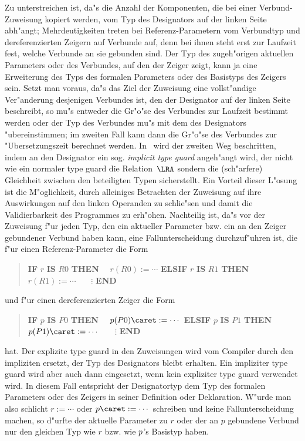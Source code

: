 Zu unterstreichen ist, da"s die Anzahl der Komponenten, die bei einer
Verbund-Zuweisung kopiert werden, vom Typ des Designators auf der linken Seite
abh"angt; Mehrdeutigkeiten treten bei Referenz-Parametern
vom Verbundtyp und dereferenzierten Zeigern auf Verbunde auf, denn bei ihnen
steht erst zur Laufzeit fest, welche Verbunde an sie gebunden sind.
Der Typ des zugeh"origen aktuellen Parameters oder des Verbundes, auf den der
Zeiger zeigt, kann ja eine Erweiterung des Typs des formalen Parameters oder
des Basistyps des Zeigers sein.
Setzt man voraus, da"s das Ziel der Zuweisung eine vollst"andige Ver"anderung
desjenigen Verbundes ist, den der Designator auf der linken Seite beschreibt,
so mu"s entweder die Gr"o"se des Verbundes zur Laufzeit bestimmt werden oder
der Typ des Verbundes mu"s mit dem des Designators "ubereinstimmen;
im zweiten Fall kann dann die Gr"o"se des Verbundes zur "Ubersetzungszeit
berechnet werden.
In \oberon\ wird der zweiten Weg beschritten, indem an den Designator ein
sog. {\it implicit type guard\/} angeh"angt wird, der nicht wie ein normaler
type guard die Relation~$\LRA$ sondern die (sch"arfere) Gleichheit zwischen
den beteiligten Typen sicherstellt.
Ein Vorteil dieser L"osung ist die M"oglichkeit, durch alleiniges Betrachten
der Zuweisung auf ihre Auswirkungen auf den linken Operanden
zu schlie"sen und damit die Validierbarkeit des Programmes zu erh"ohen.
Nachteilig ist, da"s vor der Zuweisung f"ur jeden Typ, den ein aktueller Parameter
bzw. ein an den Zeiger gebundener Verbund haben kann, eine Fallunterscheidung
durchzuf"uhren ist, die f"ur einen Referenz-Parameter die Form
\begin{quotation}
\obeylines
{\bf IF} $r$ {\bf IS} $R0$ {\bf THEN}
\ \ $r(R0):=\cdots$
{\bf ELSIF} $r$ {\bf IS} $R1$ {\bf THEN}
\ \ $r(R1):=\cdots$
\ \ \ $\vdots$
{\bf END}
\end{quotation}
und f"ur einen dereferenzierten Zeiger die Form
\begin{quotation}
\obeylines
{\bf IF} $p$ {\bf IS} $P0$ {\bf THEN}
\ \ $p(P0)\caret:=\cdots$
{\bf ELSIF} $p$ {\bf IS} $P1$ {\bf THEN}
\ \ $p(P1)\caret:=\cdots$
\ \ \ $\vdots$
{\bf END}
\end{quotation}
hat.
Der explizite type guard in den Zuweisungen wird vom Compiler durch
den impliziten ersetzt, der Typ des Designators bleibt erhalten.
Ein impliziter type guard wird aber auch dann eingesetzt, wenn kein
expliziter type guard verwendet wird.
In diesem Fall entspricht der Designatortyp dem Typ des formalen Parameters
oder des Zeigers in seiner Definition oder Deklaration.
W"urde man also schlicht $r:=\cdots$ oder $p\caret:=\cdots$ schreiben und keine
Fallunterscheidung machen, so d"urfte der aktuelle Parameter zu $r$ oder
der an $p$ gebundene Verbund nur den gleichen Typ wie $r$ bzw. wie $p\/$'s
Basistyp haben.

